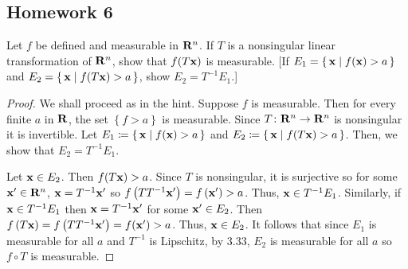 \subsection{Homework 6}
\begin{problem}
Let $f$ be defined and measurable in $\mathbf{R}^n$. If $T$ is a nonsingular
linear transformation of $\mathbf{R}^n$, show that $f(T\mathbf{x})$ is measurable. [If
$E_1=\left\{\,\mathbf{x}\;\middle|\; f(\mathbf{x})>a\,\right\}$ and
$E_2=\left\{\,\mathbf{x}\;\middle|\;f(T\mathbf{x})>a\,\right\}$, show $E_2=T^{-1}E_1$.]
\end{problem}
\begin{proof}
We shall proceed as in the hint. Suppose $f$ is measurable. Then for every
finite $a$ in $\mathbf{R}$, the set $\left\{f>a\right\}$ is measurable. Since
$T\colon\mathbf{R}^n\to\mathbf{R}^n$ is nonsingular it is invertible. Let
$E_1\coloneqq\left\{\,\mathbf{x}\;\middle|\; f(\mathbf{x})>a\,\right\}$ and
$E_2\coloneqq\left\{\,\mathbf{x}\;\middle|\;f(T\mathbf{x})>a\,\right\}$. Then, we show
that $E_2=T^{-1}E_1$.

Let $\mathbf{x}\in E_2$. Then $f(T\mathbf{x})>a$. Since $T$ is nonsingular, it is
surjective so for some $\mathbf{x}'\in\mathbf{R}^n$, $\mathbf{x}=T^{-1}\mathbf{x}'$ so
$f\left(TT^{-1}\mathbf{x}'\right)=f\left(\mathbf{x}'\right)>a$. Thus, $\mathbf{x}\in
T^{-1}E_1$. Similarly, if $\mathbf{x}\in T^{-1}E_1$ then $\mathbf{x}=T^{-1}\mathbf{x}'$ for
some $\mathbf{x}'\in E_2$. Then
$f\left(T\mathbf{x}\right)=f\left(TT^{-1}\mathbf{x}'\right)=f(\mathbf{x}')>a$. Thus, $\mathbf{x}\in
E_2$. It follows that since $E_1$ is measurable for all $a$ and $T^{-1}$ is
Lipschitz, by 3.33, $E_2$ is measurable for all $a$ so $f\circ T$ is
measurable.
\end{proof}
\newpage

